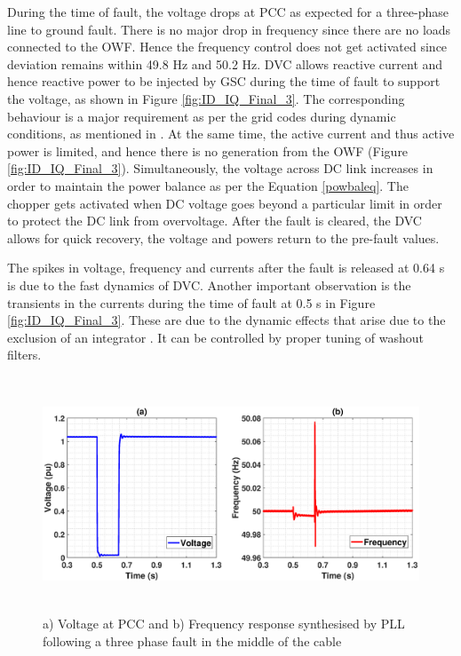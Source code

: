 During the time of fault, the voltage drops at \gls{PCC} as expected for a three-phase line to ground fault. There is no major drop in frequency since there are no loads connected to the \gls{OWF}. Hence the frequency control does not get activated since deviation remains within 49.8 Hz and 50.2 Hz.
\gls{DVC} allows reactive current and hence reactive power to be injected by \gls{GSC} during the time of fault to support the voltage, as shown in Figure \ref{fig:ID_IQ_Final_3}. The corresponding behaviour is a major requirement as per the grid codes during dynamic conditions, as mentioned in \cite{mohseni_review_2012}. At the same time, the active current and thus active power is limited, and hence there is no generation from the \gls{OWF} (Figure \ref{fig:ID_IQ_Final_3}). Simultaneously, the voltage across \gls{DC} link increases in order to maintain the power balance as per the Equation \ref{powbaleq}. The chopper gets activated when \gls{DC} voltage goes beyond a particular limit in order to protect the \gls{DC} link from overvoltage. After the fault is cleared, the \gls{DVC} allows for quick recovery, the voltage and powers return to the pre-fault values. 

The spikes in voltage, frequency and currents after the fault is released at 0.64 s is due to the fast dynamics of \gls{DVC}. Another important observation is the transients in the currents during the time of fault at 0.5 s in Figure \ref{fig:ID_IQ_Final_3}. These are due to the dynamic effects that arise due to the exclusion of an integrator \cite{korai_dynamic_2019}. It can be controlled by proper tuning of washout filters.

\begin{figure}[H]
    \includegraphics[height = 7cm,width = \textwidth]{Diagrams/Chapter_3/VACP_Freq_Final_3.eps}
    \caption{a) Voltage at PCC and b) Frequency response synthesised by PLL following a three phase fault in the middle of the cable}
    \label{fig:Vol_Freq_3phaseSC}
\end{figure}


